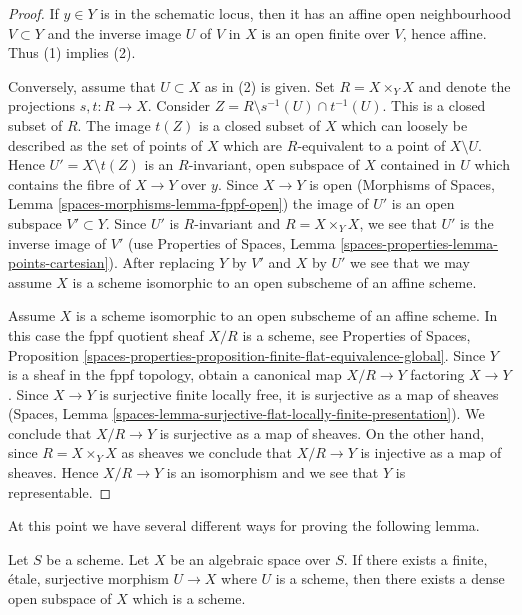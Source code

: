 \begin{proof}
If $y \in Y$ is in the schematic locus, then it has an affine open
neighbourhood $V \subset Y$ and the inverse image $U$ of $V$ in $X$
is an open finite over $V$, hence affine. Thus (1) implies (2).

\medskip\noindent
Conversely, assume that $U \subset X$ as in (2) is given.
Set $R = X \times_Y X$ and denote the projections $s, t : R \to X$.
Consider $Z = R \setminus s^{-1}(U) \cap t^{-1}(U)$.
This is a closed subset of $R$. The image $t(Z)$ is a closed
subset of $X$ which can loosely be described as the set of
points of $X$ which are $R$-equivalent to a point of
$X \setminus U$. Hence $U' = X \setminus t(Z)$ is an $R$-invariant,
open subspace of $X$ contained in $U$ which contains
the fibre of $X \to Y$ over $y$. Since $X \to Y$ is open
(Morphisms of Spaces, Lemma \ref{spaces-morphisms-lemma-fppf-open})
the image of $U'$ is an open subspace $V' \subset Y$.
Since $U'$ is $R$-invariant and $R = X \times_Y X$, we see that $U'$ is the
inverse image of $V'$ (use
Properties of Spaces, Lemma \ref{spaces-properties-lemma-points-cartesian}).
After replacing $Y$ by $V'$ and $X$ by $U'$ we see that we may assume
$X$ is a scheme isomorphic to an open subscheme of an affine scheme.

\medskip\noindent
Assume $X$ is a scheme isomorphic to an open subscheme of an affine scheme.
In this case the fppf quotient sheaf $X/R$ is a scheme, see
Properties of Spaces, Proposition
\ref{spaces-properties-proposition-finite-flat-equivalence-global}.
Since $Y$ is a sheaf in the fppf topology, obtain a canonical
map $X/R \to Y$ factoring $X \to Y$. Since $X \to Y$ is surjective
finite locally free, it is surjective as a map of sheaves
(Spaces, Lemma \ref{spaces-lemma-surjective-flat-locally-finite-presentation}).
We conclude that $X/R \to Y$ is surjective as a map of sheaves.
On the other hand, since $R = X \times_Y X$ as sheaves we conclude that
$X/R \to Y$ is injective as a map of sheaves. Hence $X/R \to Y$
is an isomorphism and we see that $Y$ is representable.
\end{proof}

\noindent
At this point we have several different ways for proving the following
lemma.

\begin{lemma}
\label{lemma-finite-etale-cover-dense-open-scheme}
Let $S$ be a scheme. Let $X$ be an algebraic space over $S$.
If there exists a finite, \'etale, surjective morphism
$U \to X$ where $U$ is a scheme, then there exists a dense open subspace
of $X$ which is a scheme.
\end{lemma}

